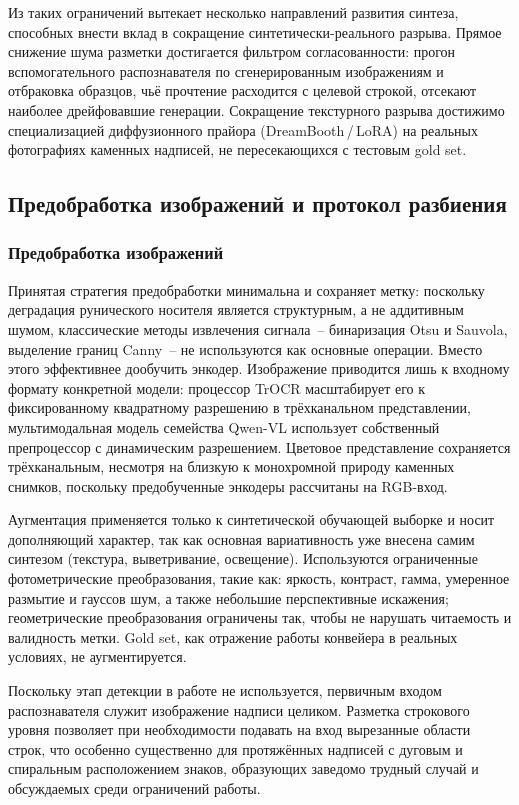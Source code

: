 \documentclass[a4paper,12pt]{extarticle}
\begin{document}
Из таких ограничений вытекает несколько направлений развития синтеза, способных внести вклад в сокращение синтетически-реального разрыва. Прямое снижение шума разметки достигается фильтром согласованности: прогон вспомогательного распознавателя по сгенерированным изображениям и отбраковка образцов, чьё прочтение расходится с целевой строкой, отсекают наиболее дрейфовавшие генерации.  Сокращение текстурного разрыва достижимо специализацией диффузионного прайора (DreamBooth\,/\,LoRA) на реальных фотографиях каменных надписей, не пересекающихся с тестовым gold set. 
 
\subsection{Предобработка изображений и протокол разбиения}
\label{sec:preprocessing}
 
\subsubsection{Предобработка изображений}
\label{sec:preprocessing-images}
 
Принятая стратегия предобработки минимальна и сохраняет метку: поскольку деградация рунического носителя является структурным, а не аддитивным шумом, классические методы извлечения сигнала~-- бинаризация Otsu и Sauvola, выделение границ Canny~-- не используются как основные операции. Вместо этого эффективнее дообучить энкодер. Изображение приводится лишь к входному формату конкретной модели: процессор TrOCR масштабирует его к фиксированному квадратному разрешению в трёхканальном представлении, мультимодальная модель семейства Qwen-VL использует собственный препроцессор с динамическим разрешением. Цветовое представление сохраняется трёхканальным, несмотря на близкую к монохромной природу каменных снимков, поскольку предобученные энкодеры рассчитаны на RGB-вход.
 
Аугментация применяется только к синтетической обучающей выборке и носит дополняющий характер, так как основная вариативность уже внесена самим синтезом (текстура, выветривание, освещение). Используются ограниченные фотометрические преобразования, такие как: яркость, контраст, гамма, умеренное размытие и гауссов шум, а также небольшие перспективные искажения; геометрические преобразования ограничены так, чтобы не нарушать читаемость и валидность метки. Gold set, как отражение работы конвейера в реальных условиях, не аугментируется. 
 
Поскольку этап детекции в работе не используется, первичным входом распознавателя служит изображение надписи целиком. Разметка строкового уровня позволяет при необходимости подавать на вход вырезанные области строк, что особенно существенно для протяжённых надписей с дуговым и спиральным расположением знаков, образующих заведомо трудный случай и обсуждаемых среди ограничений работы.
 
\end{document}

